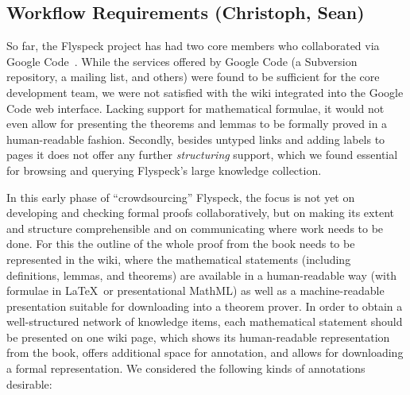 \documentclass{llncs}
\begin{document}
\subsection{Workflow Requirements (Christoph, Sean)}
\label{sec:req}

So far, the Flyspeck project has had two core members who
collaborated via Google Code~\cite{flyspeck:web}.  While the services offered by Google
Code (a Subversion repository, a mailing list, and others) were found to be sufficient for
the core development team, we were not satisfied with the wiki integrated into the Google
Code web interface.  Lacking support for mathematical formulae, it would not even allow
for presenting the theorems and lemmas to be formally proved in a human-readable fashion.
Secondly, besides untyped links and adding labels to pages it does not offer any further
\emph{structuring} support, which we found essential for browsing and querying Flyspeck's
large knowledge collection.

In this early phase of ``crowdsourcing'' Flyspeck, the focus is not yet on developing and
checking formal proofs collaboratively, but on making its extent and structure
comprehensible and on communicating where work needs to be done.  For this the outline of
the whole proof from the book needs to be represented in the wiki, where the
mathematical statements (including definitions, lemmas, and theorems) are available in a
human-readable way (with formulae in \LaTeX\ or presentational MathML) as well as a
machine-readable presentation suitable for downloading into a theorem prover.  In order to
obtain a well-structured network of knowledge items, each mathematical statement should be
presented on one wiki page, which shows its human-readable representation from the book,
offers additional space for annotation, and allows for downloading a formal
representation.  We considered the following kinds of annotations desirable:
\end{document}
